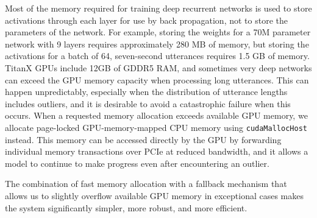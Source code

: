 Most of the memory required for training deep recurrent networks is used to
store activations through each layer for use by back propagation, not to store
the parameters of the network. For example, storing the weights for a 70M
parameter network with 9 layers requires approximately 280 MB of memory, but
storing the activations for a batch of 64, seven-second utterances requires 1.5
GB of memory. TitanX GPUs include 12GB of GDDR5 RAM, and sometimes very deep
networks can exceed the GPU memory capacity when processing long utterances.
This can happen unpredictably, especially when the distribution of utterance
lengths includes outliers, and it is desirable to avoid a catastrophic failure
when this occurs. When a requested memory allocation exceeds available GPU
memory, we allocate page-locked GPU-memory-mapped CPU memory using
\texttt{cudaMallocHost} instead. This memory can be accessed directly by the
GPU by forwarding individual memory transactions over PCIe at reduced
bandwidth, and it allows a model to continue to make progress even after
encountering an outlier.

The combination of fast memory allocation with a fallback mechanism that allows
us to slightly overflow available GPU memory in exceptional cases makes the
system significantly simpler, more robust, and more efficient.
